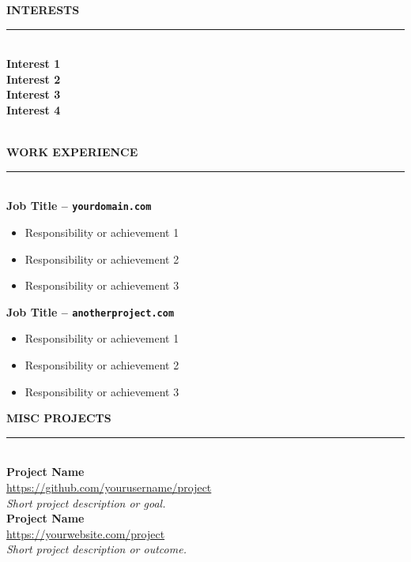 \documentclass[10pt,A4]{article}
\newcommand{\mpwidth}{\linewidth-\fboxsep-\fboxsep}
\newcommand{\cvsection}[1] {
	\vspace{14pt}
	\textbf{\LARGE{\textcolor{darkcol}{\uppercase{#1}}}}\\[-4pt]
	\textcolor{maincol}{ \rule{0.1\textwidth}{2pt} } \\
}
\newcommand{\cvskill}[2] {
	\textbf{#1} \hfill {#2}\\
}
\newcommand{\cvproject}[3]{
  \vspace{4pt}
  \textbf{{#1}} \\
  {\footnotesize\href{#2}{#2}} \\
  \textit{#3} \\
}
\begin{document}
\begin{paracol}{2}
\begin{leftcolumn}
{\begin{minipage}[t][\textheight][t]{\linewidth}
    \vspace{4pt}

    \cvsection{Interests}
    \cvskill{Interest 1}{}
    \cvskill{Interest 2}{}
    \cvskill{Interest 3}{}
    \cvskill{Interest 4}{}

    \vfill
  \end{minipage}
}
\end{leftcolumn}

\begin{rightcolumn}

\fcolorbox{white}{darkcol}{\begin{minipage}[c][3.5cm][c]{1\mpwidth}
	\begin{center}
		\HUGE{ \textbf{ \textcolor{white}{ YOUR NAME } } } \\[-24pt]
		\textcolor{white}{ \rule{0.1\textwidth}{1.25pt} } \\[4pt]
		\large{ \textcolor{white}{Your Title or Role} }
	\end{center}
\end{minipage}} \\[14pt]

\cvsection{Work Experience}

\textbf{Job Title – \texttt{yourdomain.com}}\\
\begin{itemize}
    \item Responsibility or achievement 1
    \item Responsibility or achievement 2
    \item Responsibility or achievement 3
\end{itemize}

\vspace{10pt}

\textbf{Job Title – \texttt{anotherproject.com}}\\
\begin{itemize}
    \item Responsibility or achievement 1
    \item Responsibility or achievement 2
    \item Responsibility or achievement 3
\end{itemize}

\cvsection{Misc Projects}

\cvproject
  {Project Name}
  {https://github.com/yourusername/project}
  {Short project description or goal.}

\cvproject
  {Project Name}
  {https://yourwebsite.com/project}
  {Short project description or outcome.}


\end{rightcolumn}
\end{paracol}
\end{document}
